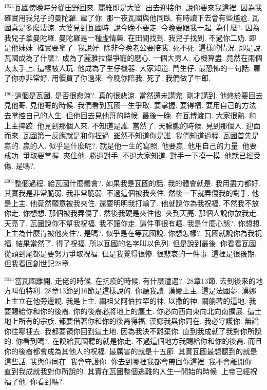 \documentclass{book}
\begin{document}
$^{1921}$瓦國傍晚時分從田野回來.
麗雅即是大婆.
出去迎接他.
說你要來我這裡.
因為我確實用我兒子的曼陀羅.
雇了你.
那一夜瓦國與他同臥.
有時讀下去會有些尷尬.
瓦國真是多麼淒涼.
大婆見到瓦國時.
說今晚不要走.
今晚要跟我一起.
為什麼?.
因為我兒子拿曼陀羅.
曼陀羅是一種虛情藥.
在田間找到.
我兒子找到.
不過你二奶.
即是他妹妹.
確實要拿了.
我說好.
除非今晚老公要陪我.
死不死.
這樣的情況.
即是說.
瓦國成為了什麼?.
成為了麗雅拉傑爭寵的磨心.
一個大男人.
心機算盡.
竟然在兩個太太手上.
這樣被人玩.
他成為了生仔機器.
大家知道.
鬥生仔.
最恐怖的一句話.
雇了你亦非常好.
用價買了你過來.
今晚你陪我.
死了.
我們做了牛郎.

$^{1961}$這個是瓦國.
是否很悲涼?.
真的很悲涼.
當然還未講完.
剛才講到.
他終於要回去見他哥.
見他哥的時候.
我們看到瓦國一生爭取.
要掌握.
要得福.
要用自己的方法.
去掌控自己的人生.
但他回去見他哥的時候.
最後一晚.
在瓦博渡口.
大家很熟.
和上主摔跤.
他見到那個人來.
不知道是誰.
當然了.
天朦朧的時候.
見到那個人.
迎面而來.
瓦國第一反應就是和你捏過.
雖然不知道你是誰.
我們知道過程.
瓦國首先是贏的.
贏的人.
似乎是什麼呢?.
就是他一生的寫照.
他要贏.
他用自己的力量.
他要成功.
爭取要掌握.
夾住他.
勝過對手.
不過大家知道.
對手一下摸一摸.
他就已經受傷.
是嗎?.

$^{2001}$整個過程.
給瓦國什麼體會?.
如果我是瓦國的話.
我的體會就是.
我用盡力都好.
其實我是非常脆弱.
我非常脆弱.
不過這個被我夾住.
然後一下就弄傷我的對手.
他是上主.
他竟然願意被我夾住.
還要明明我打輸了.
他就說你為我祝福.
不然我不放你走.
你想想.
那個被我弄傷了.
然後我硬是夾住他.
夾到天亮.
那個人說你放我走.
天亮了.
瓦國說你不幫我祝福.
我不讓你走.
這件事很有趣.
我是什麼心態?.
你想想.
上主為什麼肯被他夾住?.
是嗎?.
似乎是在等瓦國說.
你想怎樣?.
瓦國就說你為我祝福.
結果當然了.
得了祝福.
所以瓦國的名字叫以色列.
但是說到最後.
你看看瓦國.
從頭到尾都是要努力爭取祝福.
但是我覺得很慘.
很悲哀的一件事.
這裡是很後期.
但我看回創世記28章.

$^{2041}$當瓦國離開.
走佬的時候.
在抗疫的時候.
有什麼遭遇?.
28章13節.
去到後來的地方叫伯特利.
28章13節到16節是這樣說的.
你聽我讀.
漢娜上主.
這是法國夢.
漢娜上主立在他旁邊說.
我是上主.
禰祖父阿伯拉罕的神.
以撒的神.
禰躺著的這地.
我要賜給你和你的後裔.
你的後裔必將地上的塵土.
你必向西向東向北向南擴展.
這土地上所有的宗族.
都要借著你和你的後裔得福.
漢娜我與你同在.
我必守護你.
無論你往哪裡去.
我都要領你回到這土地.
因為我決不離棄你.
直到我成就了我對你所說的.
你看到嗎?.
在說給瓦國聽的就是你走.
不過這個地方我賜給你和你的後裔.
而且你的後裔都會成為其他人的祝福.
最厲害的就是十五節.
其實瓦國最想聽到的就是這些話.
我與你同在.
我會守護你.
你去到哪裡我都會帶回你這裡.
我不會離開你.
直到我成就我對你所說的.
其實在瓦國整個逃難的人生一開始的時候.
上帝已經祝福了他.
你看到嗎?.
\end{document}
